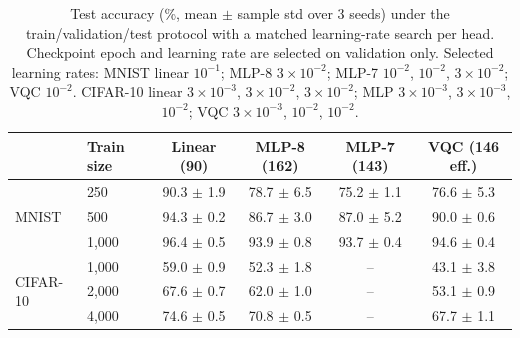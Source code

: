 \documentclass[10pt]{article}
\begin{document}
\begin{table}[t]
\centering
\caption{Test accuracy (\%, mean $\pm$ sample std over 3 seeds) under the
train/validation/test protocol with a matched learning-rate search per head.
Checkpoint epoch and learning rate are selected on validation only. Selected
learning rates: MNIST linear $10^{-1}$; MLP-8 $3\times10^{-2}$; MLP-7
$10^{-2}$, $10^{-2}$, $3\times10^{-2}$; VQC $10^{-2}$. CIFAR-10 linear
$3\times10^{-3}$, $3\times10^{-2}$, $3\times10^{-2}$; MLP $3\times10^{-3}$,
$3\times10^{-3}$, $10^{-2}$; VQC $3\times10^{-3}$, $10^{-2}$, $10^{-2}$.}
\label{tab:protocol}
\small
\begin{tabular}{llcccc}
\toprule
& Train size & Linear (90) & MLP-8 (162) & MLP-7 (143) & VQC (146 eff.) \\
\midrule
\multirow{3}{*}{MNIST}
& 250     & 90.3 $\pm$ 1.9 & 78.7 $\pm$ 6.5 & 75.2 $\pm$ 1.1 & 76.6 $\pm$ 5.3 \\
& 500     & 94.3 $\pm$ 0.2 & 86.7 $\pm$ 3.0 & 87.0 $\pm$ 5.2 & 90.0 $\pm$ 0.6 \\
& 1{,}000 & 96.4 $\pm$ 0.5 & 93.9 $\pm$ 0.8 & 93.7 $\pm$ 0.4 & 94.6 $\pm$ 0.4 \\
\midrule
\multirow{3}{*}{CIFAR-10}
& 1{,}000 & 59.0 $\pm$ 0.9 & 52.3 $\pm$ 1.8 & -- & 43.1 $\pm$ 3.8 \\
& 2{,}000 & 67.6 $\pm$ 0.7 & 62.0 $\pm$ 1.0 & -- & 53.1 $\pm$ 0.9 \\
& 4{,}000 & 74.6 $\pm$ 0.5 & 70.8 $\pm$ 0.5 & -- & 67.7 $\pm$ 1.1 \\
\bottomrule
\end{tabular}
\end{table}
\end{document}
